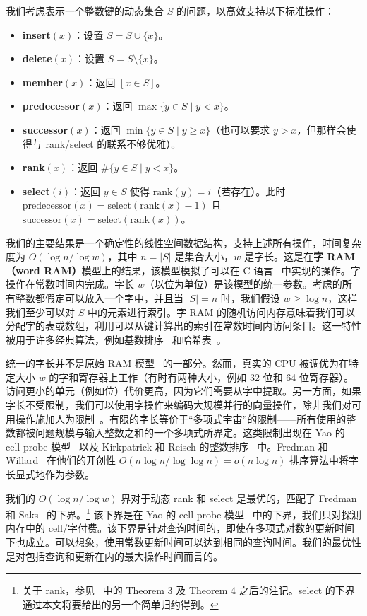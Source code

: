 \documentclass[11pt,a4paper]{ctexart}
\newcommand{\RANK}{\text{rank}}
\newcommand{\SELECT}{\text{select}}
\newcommand{\PRED}{\text{predecessor}}
\newcommand{\SUCC}{\text{successor}}
\newcommand{\RANKOP}{\text{rank}}
\begin{document}
我们考虑表示一个整数键的动态集合 $S$ 的问题，以高效支持以下标准操作：
\begin{itemize}
\item \textbf{insert}$(x)$：设置 $S = S \cup \{x\}$。
\item \textbf{delete}$(x)$：设置 $S = S \setminus \{x\}$。
\item \textbf{member}$(x)$：返回 $[x \in S]$。
\item \textbf{predecessor}$(x)$：返回 $\max\{y \in S \mid y < x\}$。
\item \textbf{successor}$(x)$：返回 $\min\{y \in S \mid y \geq x\}$（也可以要求 $y > x$，但那样会使得与 rank/select 的联系不够优雅）。
\item \textbf{rank}$(x)$：返回 $\#\{y \in S \mid y < x\}$。
\item \textbf{select}$(i)$：返回 $y \in S$ 使得 $\RANKOP(y)=i$（若存在）。此时 $\PRED(x)=\SELECT(\RANK(x)-1)$ 且 $\SUCC(x)=\SELECT(\RANK(x))$。
\end{itemize}

我们的主要结果是一个确定性的线性空间数据结构，支持上述所有操作，时间复杂度为 $O(\log n/\log w)$，其中 $n = |S|$ 是集合大小，$w$ 是字长。这是在\textbf{字 RAM（word RAM）}模型上的结果，该模型模拟了可以在 C 语言~\cite{KR78} 中实现的操作。字操作在常数时间内完成。字长 $w$（以位为单位）是该模型的统一参数。考虑的所有整数都假定可以放入一个字中，并且当 $|S|=n$ 时，我们假设 $w \geq \log n$，这样我们至少可以对 $S$ 中的元素进行索引。字 RAM 的随机访问内存意味着我们可以分配字的表或数组，利用可以从键计算出的索引在常数时间内访问条目。这一特性被用于许多经典算法，例如基数排序~\cite{Com29} 和哈希表~\cite{Dum56}。

统一的字长并不是原始 RAM 模型~\cite{CookR73} 的一部分。然而，真实的 CPU 被调优为在特定大小 $w$ 的字和寄存器上工作（有时有两种大小，例如 32 位和 64 位寄存器）。访问更小的单元（例如位）代价更高，因为它们需要从字中提取。另一方面，如果字长不受限制，我们可以使用字操作来编码大规模并行的向量操作，除非我们对可用操作施加人为限制~\cite{PS82}。有限的字长等价于``多项式宇宙''的限制——所有使用的整数都被问题规模与输入整数之和的一个多项式所界定。这类限制出现在 Yao 的 cell-probe 模型~\cite{yao81tables} 以及 Kirkpatrick 和 Reisch 的整数排序~\cite{KR84} 中。Fredman 和 Willard~\cite{fredman93fusion} 在他们的开创性 $O(n\log n/\log\log n) = o(n\log n)$ 排序算法中将字长显式地作为参数。

我们的 $O(\log n/\log w)$ 界对于动态 rank 和 select 是最优的，匹配了 Fredman 和 Saks~\cite{fredman89cellprobe} 的下界。\footnote{关于 rank，参见~\cite{fredman89cellprobe} 中的 Theorem 3 及 Theorem 4 之后的注记。select 的下界通过本文将要给出的另一个简单归约得到。} 该下界是在 Yao 的 cell-probe 模型~\cite{yao81tables} 中的下界，我们只对探测内存中的 cell/字付费。该下界是针对查询时间的，即使在多项式对数的更新时间下也成立。可以想象，使用常数更新时间可以达到相同的查询时间。我们的最优性是对包括查询和更新在内的最大操作时间而言的。
\end{document}
